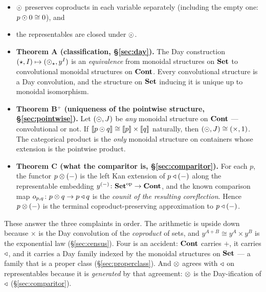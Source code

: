\begin{itemize}[nosep]
\item[\textbf{(D1)}] $\mathbin{\odot}$ preserves coproducts in each variable separately
  (including the empty one: $p\mathbin{\odot} 0\cong 0$), and
\item[\textbf{(D2)}] the representables are closed under $\mathbin{\odot}$.
\end{itemize}

\begin{itemize}
\item \textbf{Theorem A (classification, §\ref{sec:day}).} The Day construction
  $(\star,I)\mapsto(\mathbin{\odot}_\star, y^I)$ is an \emph{equivalence} from monoidal
  structures on $\mathbf{Set}$ to convolutional monoidal structures on $\mathbf{Cont}$. Every
  convolutional structure is a Day convolution, and the structure on $\mathbf{Set}$
  inducing it is unique up to monoidal isomorphism.

\item \textbf{Theorem B$^+$ (uniqueness of the pointwise structure,
  §\ref{sec:pointwise}).} Let $(\mathbin{\odot},J)$ be \emph{any} monoidal structure on
  $\mathbf{Cont}$ --- convolutional or not. If $\llbracket p\mathbin{\odot} q \rrbracket\cong\llbracket p \rrbracket\times\llbracket q \rrbracket$
  naturally, then $(\mathbin{\odot},J)\cong(\times,1)$. The categorical product is the
  \emph{only} monoidal structure on containers whose extension is the pointwise
  product.

\item \textbf{Theorem C (what the comparitor is, §\ref{sec:comparitor}).}
  For each $p$, the functor $p\mathbin{\otimes}(-)$ is the left Kan extension of $p\mathbin{\triangleleft}(-)$
  along the representable embedding $y^{(-)}\colon\mathbf{Set}^{\mathrm{op}}\to\mathbf{Cont}$,
  and the known comparison map $o_{p,q}\colon p\mathbin{\otimes} q\to p\mathbin{\triangleleft} q$ is the
  \emph{counit of the resulting coreflection}. Hence $p\mathbin{\otimes}(-)$ is the terminal
  coproduct-preserving approximation to $p\mathbin{\triangleleft}(-)$.
\end{itemize}

These answer the three complaints in order. The arithmetic is upside down
because $\times$ is the Day convolution of the \emph{coproduct} of sets, and
$y^{A+B}\cong y^A\times y^B$ is the exponential law (§\ref{sec:census}). Four is
an accident: $\mathbf{Cont}$ carries $+$, it carries $\mathbin{\triangleleft}$, and it carries a Day family
indexed by the monoidal structures on $\mathbf{Set}$ --- a family that is a proper class
(§\ref{sec:properclass}). And $\mathbin{\otimes}$ agrees with $\mathbin{\triangleleft}$ on representables
because it is \emph{generated} by that agreement: $\mathbin{\otimes}$ is the Day-ification of
$\mathbin{\triangleleft}$ (§\ref{sec:comparitor}).

